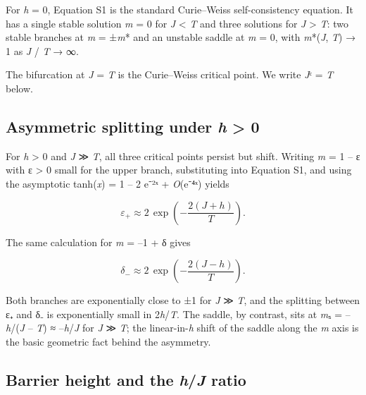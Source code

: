\documentclass[11pt,letterpaper]{article}
\begin{document}
For \emph{h} = 0, Equation S1 is the standard Curie--Weiss self-consistency equation. It has a single stable solution \emph{m} = 0 for \emph{J} \textless{} \emph{T} and three solutions for \emph{J} \textgreater{} \emph{T}: two stable branches at \emph{m} = ±\emph{m}* and an unstable saddle at \emph{m} = 0, with \emph{m}*(\emph{J}, \emph{T}) → 1 as \emph{J} / \emph{T} → ∞.

The bifurcation at \emph{J} = \emph{T} is the Curie--Weiss critical point. We write \emph{J}ᶜ = \emph{T} below.

\subsection{\texorpdfstring{Asymmetric splitting under \emph{h} \textgreater{} 0}{Asymmetric splitting under h \textgreater{} 0}}\label{asymmetric-splitting-under-h-0}

For \emph{h} \textgreater{} 0 and \emph{J} ≫ \emph{T}, all three critical points persist but shift. Writing \emph{m} = 1 -- ε with ε \textgreater{} 0 small for the upper branch, substituting into Equation S1, and using the asymptotic tanh(\emph{x}) = 1 -- 2 e⁻²ˣ + \emph{O}(e⁻⁴ˣ) yields


\begin{equation*}
\varepsilon_+ \approx 2\,\exp\!\left(-\frac{2(J + h)}{T}\right). \tag{S2}
\end{equation*}


The same calculation for \emph{m} = --1 + δ gives


\begin{equation*}
\delta_- \approx 2\,\exp\!\left(-\frac{2(J - h)}{T}\right). \tag{S3}
\end{equation*}


Both branches are exponentially close to ±1 for \emph{J} ≫ \emph{T}, and the splitting between ε₊ and δ₋ is exponentially small in 2\emph{h}/\emph{T}. The saddle, by contrast, sits at \emph{m}ₛ = --\emph{h}/(\emph{J} -- \emph{T}) ≈ --\emph{h}/\emph{J} for \emph{J} ≫ \emph{T}; the linear-in-\emph{h} shift of the saddle along the \emph{m} axis is the basic geometric fact behind the asymmetry.

\subsection{\texorpdfstring{Barrier height and the \emph{h}/\emph{J} ratio}{Barrier height and the h/J ratio}}\label{barrier-height-and-the-hj-ratio}
\end{document}
